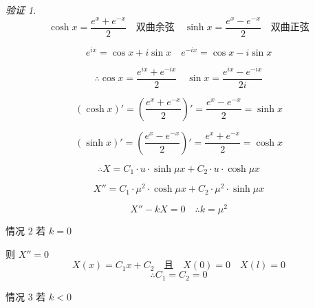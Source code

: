 \documentclass[12pt,a4paper]{article}
\numberwithin{subsection}{section}   %
\numberwithin{subsubsection}{subsection}
\theoremstyle{plain}
\theoremstyle{definition}
\theoremstyle{remark}
\theoremstyle{remark}
\newtheorem{verification}[theorem]{验证}
\begin{document}
	
	\begin{verification}	
		\begin{equation*}
			\cosh x = \frac{e^x + e^{-x}}{2} \quad \text{双曲余弦} \quad \sinh x = \frac{e^x - e^{-x}}{2} \quad \text{双曲正弦}
		\end{equation*}
		
		\begin{equation*}
			e^{ix} = \cos x + i \sin x \quad e^{-ix} = \cos x - i \sin x
		\end{equation*}
		
		\begin{equation*}
			\therefore \cos x = \frac{e^{ix} + e^{-ix}}{2} \quad \sin x = \frac{e^{ix} - e^{-ix}}{2i}
		\end{equation*}
		
		\begin{equation*}
			(\cosh x)' = \left( \frac{e^x + e^{-x}}{2} \right)' = \frac{e^x - e^{-x}}{2} = \sinh x
		\end{equation*}
		
		\begin{equation*}
			(\sinh x)' = \left( \frac{e^x - e^{-x}}{2} \right)' = \frac{e^x + e^{-x}}{2} = \cosh x
		\end{equation*}
		
		\begin{equation*}
			\therefore X = C_1 \cdot u \cdot \sinh \mu x + C_2 \cdot u \cdot \cosh \mu x
		\end{equation*}
		
		\begin{equation*}
			X'' = C_1 \cdot \mu^2 \cdot \cosh \mu x + C_2 \cdot \mu^2 \cdot \sinh \mu x
		\end{equation*}
		
		\begin{equation*}
			X'' - kX = 0 \quad \therefore k = \mu^2
		\end{equation*}
		
	\end{verification}	
	
	
情况 2 \quad 若 \(k = 0\)

则 \(X'' = 0\)
	\begin{equation}
		X(x) = C_1 x + C_2 \quad \text{且} \quad X(0) = 0 \quad X(l) = 0
	\end{equation}
	\begin{equation}
		\therefore C_1 = C_2 = 0
	\end{equation}
	
情况 3 \quad 若 \(k < 0\)
\end{document}
